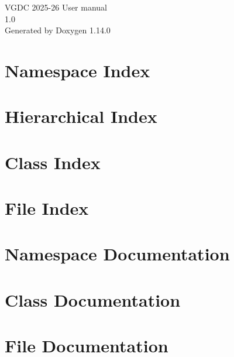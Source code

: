\documentclass[twoside]{book}
\newcommand{\+}{\discretionary{\mbox{\scriptsize$\hookleftarrow$}}{}{}}
\newcommand{\clearemptydoublepage}{%
    \newpage{\pagestyle{empty}\cleardoublepage}%
  }
\begin{document}
  \raggedbottom
    \hypersetup{pageanchor=false,
                bookmarksnumbered=true,
                pdfencoding=unicode
               }
  \begin{titlepage}
  \vspace*{7cm}
  \begin{center}%
  {\Large VGDC 2025-\/26 User manual}\\
  [1ex]\large 1.\+0 \\
  \vspace*{1cm}
  {\large Generated by Doxygen 1.14.0}\\
  \end{center}
  \end{titlepage}
  \clearemptydoublepage
  \tableofcontents
  \clearemptydoublepage
  \hypersetup{pageanchor=true}


\chapter{Namespace Index}

\chapter{Hierarchical Index}

\chapter{Class Index}

\chapter{File Index}

\chapter{Namespace Documentation}


\chapter{Class Documentation}




\chapter{File Documentation}






  \backmatter
  \newpage
  \clearemptydoublepage
  \printindex
\end{document}
